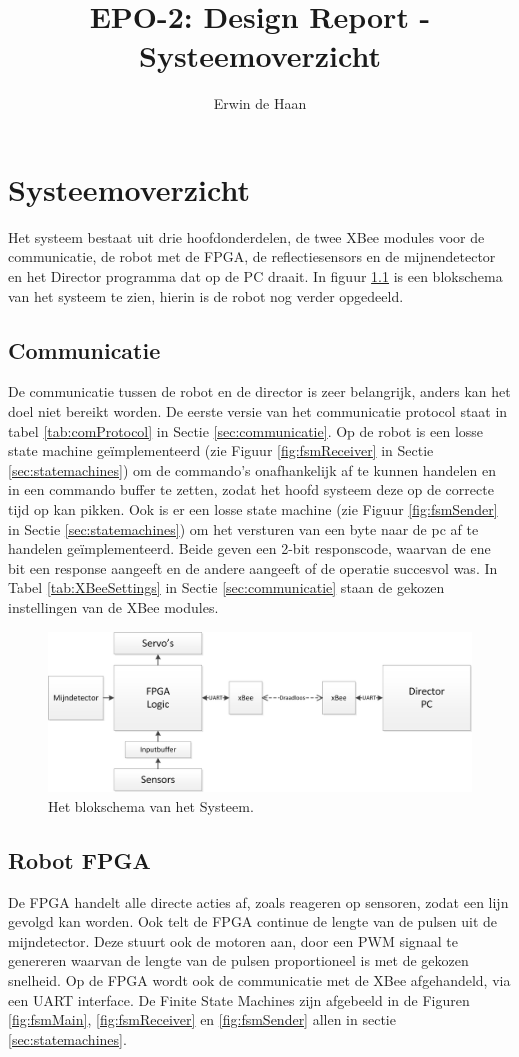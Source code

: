 \documentclass{report}
\title{EPO-2: Design Report - Systeemoverzicht}
\author{Erwin de Haan}
\begin{document}
\chapter{Systeemoverzicht}
\label{ch:systeem}
Het systeem bestaat uit drie hoofdonderdelen, de twee XBee modules voor de communicatie, de robot met de FPGA, de reflectiesensors en de mijnendetector en het Director programma dat op de PC draait.
In figuur \ref{fig:topLevelSystem} is een blokschema van het systeem te zien, hierin is de robot nog verder opgedeeld. 
\section{Communicatie}
De communicatie tussen de robot en de director is zeer belangrijk, anders kan het doel niet bereikt worden.
De eerste versie van het communicatie protocol staat in tabel \ref{tab:comProtocol} in Sectie \ref{sec:communicatie}.
Op de robot is een losse state machine geïmplementeerd (zie Figuur \ref{fig:fsmReceiver} in Sectie \ref{sec:statemachines}) om de commando's onafhankelijk af te kunnen handelen en in een commando buffer te zetten, zodat het hoofd systeem deze op de correcte tijd op kan pikken.
Ook is er een losse state machine (zie Figuur \ref{fig:fsmSender} in Sectie \ref{sec:statemachines}) om het versturen van een byte naar de pc af te handelen geïmplementeerd.
Beide geven een 2-bit responscode, waarvan de ene bit een response aangeeft en de andere aangeeft of de operatie succesvol was.
In Tabel \ref{tab:XBeeSettings} in Sectie \ref{sec:communicatie} staan de gekozen instellingen van de XBee modules.
\begin{figure}
\centering
\caption{Het blokschema van het Systeem.}
\label{fig:topLevelSystem}
\includegraphics[width=\textwidth]{top-level-system}
\end{figure}
\section{Robot FPGA}
De FPGA handelt alle directe acties af, zoals reageren op sensoren, zodat een lijn gevolgd kan worden. Ook telt de FPGA continue de lengte van de pulsen uit de mijndetector.
Deze stuurt ook de motoren aan, door een PWM signaal te genereren waarvan de lengte van de pulsen proportioneel is met de gekozen snelheid.
Op de FPGA wordt ook de communicatie met de XBee afgehandeld, via een UART interface.
De Finite State Machines zijn afgebeeld in de Figuren \ref{fig:fsmMain}, \ref{fig:fsmReceiver} en \ref{fig:fsmSender} allen in sectie \ref{sec:statemachines}.
\end{document}
